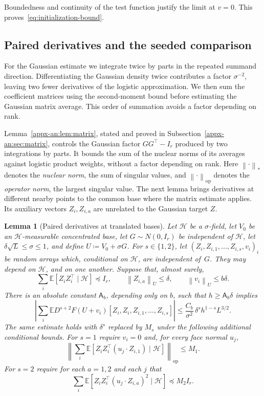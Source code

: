 \documentclass[11pt,letterpaper]{article}
\newtheorem{lemma}{Lemma}
\theoremstyle{remark}
\newcommand{\E}{\mathbb E}
\newcommand{\op}{\mathrm{op}}
\newcommand{\norm}[1]{\left\lVert#1\right\rVert}
\begin{document}
Boundedness and continuity of the test function justify the limit
at \(v=0\). This proves~\eqref{eq:initialization-bound}.

\subsection{Paired derivatives and the seeded comparison}
\label{appx-an:sec:restoration}

For the Gaussian estimate we integrate twice by parts in the repeated
summand direction. Differentiating the Gaussian density twice contributes a factor
\(\sigma^{-2}\), leaving two fewer derivatives of the logistic
approximation. We then sum the coefficient matrices using the
second-moment bound before estimating the Gaussian matrix average.
This order of summation avoids a factor depending on rank.

Lemma~\ref{appx-an:lem:matrix}, stated and proved in
Subsection~\ref{appx-an:sec:matrix}, controls the Gaussian factor
\(GG^\top-I_r\) produced by two integrations by parts. It bounds
the sum of the nuclear norms of its averages against logistic product
weights, without a factor depending on rank. Here
\(\norm{\cdot}_*\) denotes the \emph{nuclear norm}, the sum of singular
values, and \(\norm{\cdot}_\op\) denotes the \emph{operator norm},
the largest singular value. The next lemma brings derivatives at
different nearby points to the common base where the matrix estimate
applies. Its auxiliary vectors \(Z_i,Z_{i,a}\) are unrelated to the
Gaussian target \(Z\).

\begin{lemma}[Paired derivatives at translated bases]
\label{appx-an:lem:restoration}
Let \(\mathcal H\) be a \(\sigma\)-field, let \(V_0\) be an
\(\mathcal H\)-measurable concentrated base, let \(G\sim N(0,I_r)\) be
independent of \(\mathcal H\), let \(\delta\sqrt L\le\sigma\le1\), and {define}
\(U\coloneqq V_0+\sigma G\). For \(s\in\{1,2\}\), let
\((Z_i,Z_{i,1},\ldots,Z_{i,s},v_i)_i\) be random arrays which, conditional
on \(\mathcal H\), are independent of~\(G\). They may depend on
\(\mathcal H\), and on one another. Suppose that, almost surely,
\begin{equation}
 \sum_i\E[Z_iZ_i^\top\mid\mathcal H]\preceq I_r,
 \qquad \norm{Z_{i,a}}_U\le\delta,
 \qquad \norm{v_i}_U\le b\delta.
 \label{appx-an:conditional-budget}
\end{equation}
There is an absolute constant \(\mathsf A_b\), depending only on \(b\),
such that \(h\ge\mathsf A_b\delta\) implies
\begin{equation}
 \left|\sum_i\E D^{s+2}F(U+v_i)
         [Z_i,Z_i,Z_{i,1},\ldots,Z_{i,s}]\right|
 \le\frac{C_b}{\sigma^2}\,
                 \delta^s h^{1-s}L^{3/2}.
 \label{appx-an:restoration-bound}
\end{equation}
The same estimate holds with $\delta^s$ replaced by $M_s$ under the following additional conditional bounds. For $s=1$ require $v_i=0$ and, for every face normal $u_j$,
\[
 \left\|\sum_i\E[Z_iZ_i^\top (u_j\cdot Z_{i,1})\mid\mathcal H]\right\|_{\op}\le M_1.
\]
For $s=2$ require for each $a=1,2$ and each $j$ that
\[
 \sum_i\E[Z_iZ_i^\top (u_j\cdot Z_{i,a})^2\mid\mathcal H]\preceq M_2 I_r .
\]
\end{lemma}
\end{document}
